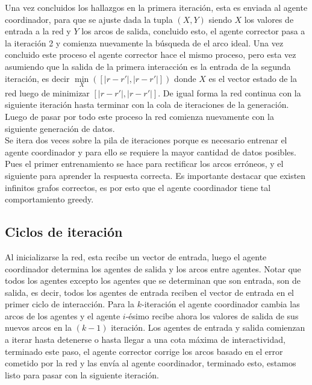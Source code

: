 \documentclass{article}
\begin{document}
        Una vez concluidos los hallazgos en la primera iteración, esta es enviada al agente coordinador, para que se ajuste dada la tupla $(X,Y)$ siendo
        $X$ los valores de entrada a la red y $Y$ los arcos de salida, concluido esto, el agente corrector pasa a la iteración 2 y comienza nuevamente la búsqueda de el arco ideal. Una vez concluido este proceso
        el agente corrector hace el mismo proceso, pero esta vez asumiendo que la salida de la primera interacción es la entrada de la segunda iteración, es decir $\underset{X}{\min}([|r-r'|,|r-r'|])$ donde $X$ es el vector estado de la red luego de minimizar $[|r-r'|,|r-r'|]$.
        De igual forma la red continua con la siguiente iteración hasta terminar con la cola de iteraciones de la generación. Luego de pasar por todo este proceso la red comienza nuevamente con la siguiente generación de datos. \\

        Se itera dos veces sobre la pila de iteraciones porque es necesario entrenar el agente coordinador y para ello se requiere la mayor cantidad de datos posibles. Pues el primer entrenamiento se hace para rectificar los arcos erróneos, y el siguiente para aprender la respuesta correcta.
        Es importante destacar que existen infinitos grafos correctos, es por esto que el agente coordinador tiene tal comportamiento greedy.

        \subsection*{Ciclos de iteración}

         Al inicializarse la red, esta recibe un vector de entrada, luego el agente coordinador determina los agentes de salida y los arcos entre agentes. Notar que todos los agentes excepto los agentes que se determinan que son entrada, son de salida, es decir, todos los agentes de entrada reciben el vector de entrada en el primer ciclo de interacción. Para la $k$-iteración el agente coordinador cambia las arcos de los agentes y el agente $i$-ésimo recibe ahora los valores de salida de sus nuevos arcos en la $(k-1)$ iteración. Los agentes de entrada y salida comienzan a iterar hasta detenerse o hasta llegar a una cota máxima de interactividad, terminado este paso, el agente corrector corrige los arcos basado en el error cometido por la red y las envía al agente coordinador, terminado esto, estamos listo para pasar con la siguiente iteración. \\
\end{document}

